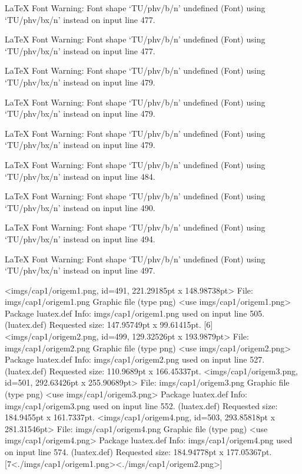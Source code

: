 LaTeX Font Warning: Font shape `TU/phv/b/n' undefined
(Font)              using `TU/phv/bx/n' instead on input line 477.


LaTeX Font Warning: Font shape `TU/phv/b/n' undefined
(Font)              using `TU/phv/bx/n' instead on input line 477.


LaTeX Font Warning: Font shape `TU/phv/b/n' undefined
(Font)              using `TU/phv/bx/n' instead on input line 479.


LaTeX Font Warning: Font shape `TU/phv/b/n' undefined
(Font)              using `TU/phv/bx/n' instead on input line 479.


LaTeX Font Warning: Font shape `TU/phv/b/n' undefined
(Font)              using `TU/phv/bx/n' instead on input line 479.


LaTeX Font Warning: Font shape `TU/phv/b/n' undefined
(Font)              using `TU/phv/bx/n' instead on input line 484.


LaTeX Font Warning: Font shape `TU/phv/b/n' undefined
(Font)              using `TU/phv/bx/n' instead on input line 490.


LaTeX Font Warning: Font shape `TU/phv/b/n' undefined
(Font)              using `TU/phv/bx/n' instead on input line 494.


LaTeX Font Warning: Font shape `TU/phv/b/n' undefined
(Font)              using `TU/phv/bx/n' instead on input line 497.

<imgs/cap1/origem1.png, id=491, 221.29185pt x 148.98738pt>
File: imgs/cap1/origem1.png Graphic file (type png)
<use imgs/cap1/origem1.png>
Package luatex.def Info: imgs/cap1/origem1.png  used on input line 505.
(luatex.def)             Requested size: 147.95749pt x 99.61415pt.
[6]
<imgs/cap1/origem2.png, id=499, 129.32526pt x 193.9879pt>
File: imgs/cap1/origem2.png Graphic file (type png)
<use imgs/cap1/origem2.png>
Package luatex.def Info: imgs/cap1/origem2.png  used on input line 527.
(luatex.def)             Requested size: 110.9689pt x 166.45337pt.
<imgs/cap1/origem3.png, id=501, 292.63426pt x 255.90689pt>
File: imgs/cap1/origem3.png Graphic file (type png)
<use imgs/cap1/origem3.png>
Package luatex.def Info: imgs/cap1/origem3.png  used on input line 552.
(luatex.def)             Requested size: 184.9455pt x 161.7337pt.
<imgs/cap1/origem4.png, id=503, 293.85818pt x 281.31546pt>
File: imgs/cap1/origem4.png Graphic file (type png)
<use imgs/cap1/origem4.png>
Package luatex.def Info: imgs/cap1/origem4.png  used on input line 574.
(luatex.def)             Requested size: 184.94778pt x 177.05367pt.
[7<./imgs/cap1/origem1.png><./imgs/cap1/origem2.png>]

